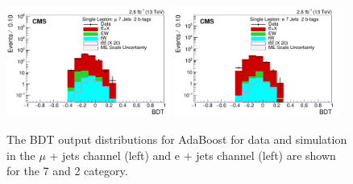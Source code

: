 \begin{figure}[ht!]
    \includegraphics[width=0.48\textwidth]{images/Run2/BDT_Mu29Aug400trees_5MinNodeSize_20nCuts_3MaxDepth_5adaboostbeta_adaBoost_alphaSTune_noMinEvents7nJets2nMtags_StackLogY.pdf}
    \includegraphics[width=0.48\textwidth]{images/Run2/BDT_El29Aug400trees_5MinNodeSize_20nCuts_3MaxDepth_5adaboostbeta_adaBoost_alphaSTune_noMinEvents7nJets2nMtags_StackLogY.pdf} 
    \caption{The BDT output distributions for AdaBoost for data and simulation in the $\mu$ + jets channel (left) and e + jets channel (left) are shown for the 7 \njets and 2 \nMtags category.}
    \label{fig:BDT_Mu29Aug400trees_5MinNodeSize_20nCuts_3MaxDepth_5adaboostbeta_adaBoost_alphaSTune_noMinEvents72}
 \end{figure}

